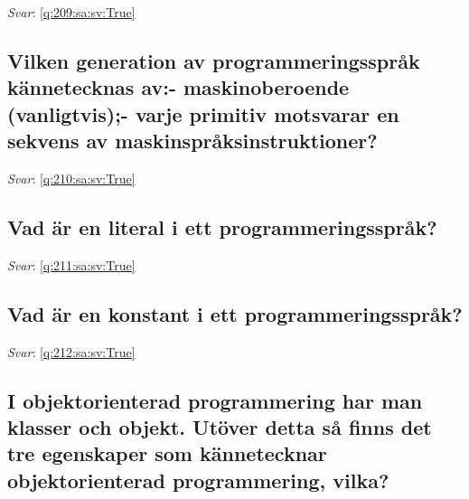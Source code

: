 \documentclass[a4paper,11pt,oneside]{article}
\begin{document}
\begin{sloppypar}
\textit{Svar}: \autoref{q:209:sa:sv:True}



\subsection{Vilken generation av programmeringsspr\r{a}k k\"annetecknas av:- maskinoberoende (vanligtvis);- varje primitiv motsvarar en sekvens av maskinspr\r{a}ksinstruktioner?}

\label{q:210:sa:sv:False}

\vspace{2cm}

\noindent\makebox[\textwidth]{\hrulefill}

\vspace{1cm}

\textit{Svar}: \autoref{q:210:sa:sv:True}



\subsection{Vad \"ar en literal i ett programmeringsspr\r{a}k?}

\label{q:211:sa:sv:False}

\vspace{2cm}

\noindent\makebox[\textwidth]{\hrulefill}

\vspace{1cm}

\textit{Svar}: \autoref{q:211:sa:sv:True}



\subsection{Vad \"ar en konstant i ett programmeringsspr\r{a}k?}

\label{q:212:sa:sv:False}

\vspace{2cm}

\noindent\makebox[\textwidth]{\hrulefill}

\vspace{1cm}

\textit{Svar}: \autoref{q:212:sa:sv:True}



\subsection{I objektorienterad programmering har man klasser och objekt. Ut\"over detta s\r{a} finns det tre egenskaper som k\"annetecknar objektorienterad programmering, vilka?}


\end{sloppypar}
\end{document}
